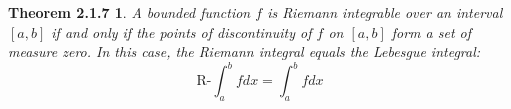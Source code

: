 \documentclass{article}
\theoremstyle{plain}
\newtheorem*{two_one_seven_theorem*}{Theorem 2.1.7}
\begin{document}
\begin{two_one_seven_theorem*}
A bounded function $f$ is Riemann integrable over an interval $\left[a,b \right] $ if and only if the points of discontinuity of $f$ on $\left[a,b\right]$ form a set of measure zero. In this case, the Riemann integral equals the Lebesgue integral:
$$
\text{R-}\int_{a}^{b} f dx = \int_{a}^{b} f dx
$$
\end{two_one_seven_theorem*}

\end{document}
